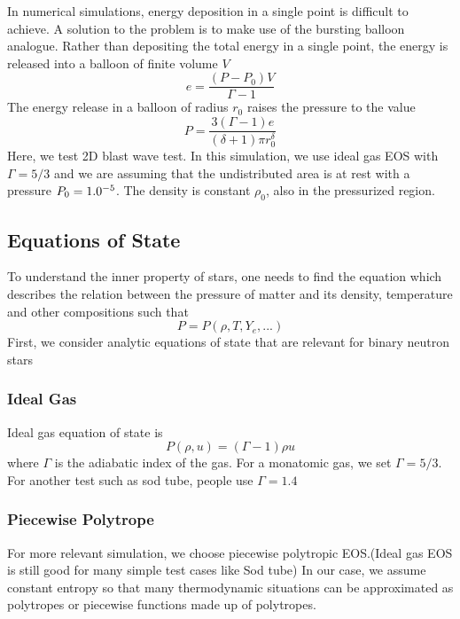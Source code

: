 \documentclass[notes.tex]{subfiles}
\begin{document}
In numerical simulations, energy deposition in a single point is difficult to achieve. A solution to the problem is to make use of the bursting balloon analogue. Rather than depositing the total energy in a single point, the energy is released into a balloon of finite volume $V$
\begin{equation}
e = \frac{(P-P_0)V}{\Gamma -1}
\end{equation}
The energy release in a balloon of radius $r_0$ raises the pressure to the value
\begin{equation}
P = \frac{3(\Gamma-1)e}{(\delta+1) \pi r_0^{\delta}}
\end{equation}
Here, we test 2D blast wave test. In this simulation, we use ideal gas EOS with $\Gamma = 5/3$ and we are assuming that the undistributed area is at rest with a pressure $P_0 = 1.0 \time 10^{-5}$. The density is constant $\rho_0$, also in the pressurized region.


\subsection{Equations of State}
\label{sec:eos}
To understand the inner property of stars, one needs to find the equation which describes the relation between the pressure of matter and its density, temperature and other compositions such that
\begin{equation}
P = P(\rho, T, Y_e, ...)
\end{equation}
First, we consider analytic equations of state that are relevant for binary neutron stars
\subsubsection{Ideal Gas}
Ideal gas equation of state is
\begin{equation}
P(\rho,u) = (\Gamma - 1) \rho u
\end{equation}
where $\Gamma$ is the adiabatic index of the gas. For a monatomic gas, we set $\Gamma = 5/3$. For another test such as sod tube, people use $\Gamma = 1.4$
\subsubsection{Piecewise Polytrope}
For more relevant simulation, we choose piecewise polytropic EOS.(Ideal gas EOS is still good for many simple test cases like Sod tube) In our case, we assume constant entropy so that many thermodynamic situations can be approximated as polytropes or piecewise functions made up of polytropes.
\end{document}
